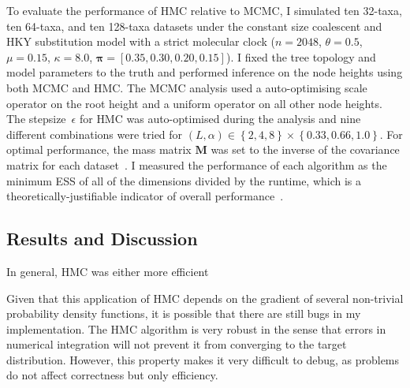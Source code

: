 \documentclass{article}
\renewcommand{\vec}[1]{\ensuremath{\boldsymbol{\mathbf{#1}}}}
\newcommand{\mat}[1]{\ensuremath{\boldsymbol{\mathbf{#1}}}}
\begin{document}
    To evaluate the performance of \ac{HMC} relative to \ac{MCMC}, I simulated
        ten 32-taxa, ten 64-taxa, and ten 128-taxa datasets under the constant
        size coalescent and HKY substitution model with a strict molecular
        clock ($n = 2048$, $\theta = 0.5$, $\mu = 0.15$, $\kappa = 8.0$,
        $\vec{\pi} = \left[0.35, 0.30, 0.20, 0.15\right]$).
    I fixed the tree topology and model parameters to the truth and performed
        inference on the node heights using both \ac{MCMC} and \ac{HMC}.
    The \ac{MCMC} analysis used a auto-optimising scale operator on the root
        height and a uniform operator on all other node heights.
    The stepsize~$\epsilon$ for \ac{HMC} was auto-optimised during the analysis
        and nine different combinations were tried for
        $\left(L, \alpha\right) \in \left\{2, 4, 8\right\} \times \left\{0.33, 0.66, 1.0\right\}$.
    For optimal performance, the mass matrix $\mat{M}$ was set to the inverse
        of the covariance matrix for each dataset~\cite{Nea11}.
    I measured the performance of each algorithm as the minimum \ac{ESS} of
        all of the dimensions divided by the runtime, which is a
        theoretically-justifiable indicator of overall
        performance~\cite{Tho10}.

    \subsection*{Results and Discussion}

    In general, \ac{HMC} was either more efficient

    Given that this application of \ac{HMC} depends on the gradient of several
        non-trivial probability density functions, it is possible that there
        are still bugs in my implementation.
    The \ac{HMC} algorithm is very robust in the sense that errors in numerical
        integration will not prevent it from converging to the target
        distribution.
    However, this property makes it very difficult to debug, as problems do not
        affect correctness but only efficiency.
\end{document}
